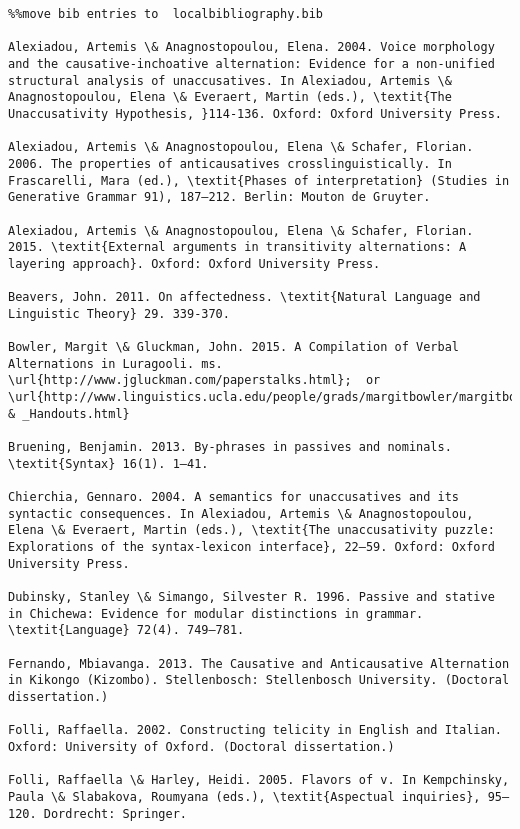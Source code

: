 \documentclass[output=paper]{langsci/langscibook}
\begin{document}
\begin{verbatim}%%move bib entries to  localbibliography.bib

Alexiadou, Artemis \& Anagnostopoulou, Elena. 2004. Voice morphology and the causative-inchoative alternation: Evidence for a non-unified structural analysis of unaccusatives. In Alexiadou, Artemis \& Anagnostopoulou, Elena \& Everaert, Martin (eds.), \textit{The Unaccusativity Hypothesis, }114-136. Oxford: Oxford University Press.

Alexiadou, Artemis \& Anagnostopoulou, Elena \& Schafer, Florian. 2006. The properties of anticausatives crosslinguistically. In Frascarelli, Mara (ed.), \textit{Phases of interpretation} (Studies in Generative Grammar 91), 187–212. Berlin: Mouton de Gruyter.

Alexiadou, Artemis \& Anagnostopoulou, Elena \& Schafer, Florian. 2015. \textit{External arguments in transitivity alternations: A layering approach}. Oxford: Oxford University Press.

Beavers, John. 2011. On affectedness. \textit{Natural Language and Linguistic Theory} 29. 339-370.

Bowler, Margit \& Gluckman, John. 2015. A Compilation of Verbal Alternations in Luragooli. ms. \url{http://www.jgluckman.com/paperstalks.html};  or \url{http://www.linguistics.ucla.edu/people/grads/margitbowler/margitbowler/Papers_ & _Handouts.html}

Bruening, Benjamin. 2013. By-phrases in passives and nominals. \textit{Syntax} 16(1). 1–41.

Chierchia, Gennaro. 2004. A semantics for unaccusatives and its syntactic consequences. In Alexiadou, Artemis \& Anagnostopoulou, Elena \& Everaert, Martin (eds.), \textit{The unaccusativity puzzle: Explorations of the syntax-lexicon interface}, 22–59. Oxford: Oxford University Press.

Dubinsky, Stanley \& Simango, Silvester R. 1996. Passive and stative in Chichewa: Evidence for modular distinctions in grammar. \textit{Language} 72(4). 749–781.

Fernando, Mbiavanga. 2013. The Causative and Anticausative Alternation in Kikongo (Kizombo). Stellenbosch: Stellenbosch University. (Doctoral dissertation.)

Folli, Raffaella. 2002. Constructing telicity in English and Italian. Oxford: University of Oxford. (Doctoral dissertation.)

Folli, Raffaella \& Harley, Heidi. 2005. Flavors of v. In Kempchinsky, Paula \& Slabakova, Roumyana (eds.), \textit{Aspectual inquiries}, 95–120. Dordrecht: Springer.


\end{verbatim}
\end{document}
